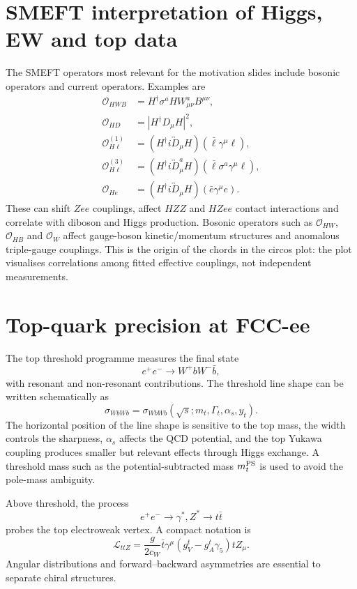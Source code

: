 \documentclass[11pt,a4paper]{report}
\newcommand{\ee}{e^+e^-}
\begin{document}
\section{SMEFT interpretation of Higgs, EW and top data}
The SMEFT operators most relevant for the motivation slides include bosonic operators and current operators.  Examples are
\begin{align}
  \mathcal O_{HWB}&=H^\dagger\sigma^aH W^a_{\mu\nu}B^{\mu\nu},\\
  \mathcal O_{HD}&=\left|H^\dagger D_\mu H\right|^2,\\
  \mathcal O_{H\ell}^{(1)}&=(H^\dagger i\overleftrightarrow D_\mu H)(\bar\ell\gamma^\mu\ell),\\
  \mathcal O_{H\ell}^{(3)}&=(H^\dagger i\overleftrightarrow D_\mu^a H)(\bar\ell\sigma^a\gamma^\mu\ell),\\
  \mathcal O_{He}&=(H^\dagger i\overleftrightarrow D_\mu H)(\bar e\gamma^\mu e).
\end{align}
These can shift $Zee$ couplings, affect $HZZ$ and $HZee$ contact interactions and correlate with diboson and Higgs production.  Bosonic operators such as $\mathcal O_{HW}$, $\mathcal O_{HB}$ and $\mathcal O_W$ affect gauge-boson kinetic/momentum structures and anomalous triple-gauge couplings.  This is the origin of the chords in the circos plot: the plot visualises correlations among fitted effective couplings, not independent measurements.

\section{Top-quark precision at FCC-ee}
The top threshold programme measures the final state
\begin{equation}
  \ee\to W^+bW^-\bar b,
\end{equation}
with resonant and non-resonant contributions.  The threshold line shape can be written schematically as
\begin{equation}
  \sigma_{WbWb}=\sigma_{WbWb}(\sqrt{s};m_t,\Gamma_t,\alpha_s,y_t).
\end{equation}
The horizontal position of the line shape is sensitive to the top mass, the width controls the sharpness, $\alpha_s$ affects the QCD potential, and the top Yukawa coupling produces smaller but relevant effects through Higgs exchange.  A threshold mass such as the potential-subtracted mass $m_t^{\rm PS}$ is used to avoid the pole-mass ambiguity.

Above threshold, the process
\begin{equation}
  \ee\to \gamma^*,Z^*\to t\bar t
\end{equation}
probes the top electroweak vertex.  A compact notation is
\begin{equation}
  \mathcal L_{ttZ}=\frac{g}{2c_W}\bar t\gamma^\mu\left(g_V^t-g_A^t\gamma_5\right)tZ_\mu.
\end{equation}
Angular distributions and forward--backward asymmetries are essential to separate chiral structures.
\end{document}
